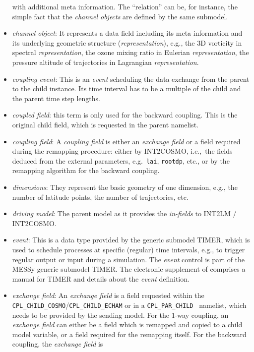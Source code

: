 \documentclass[11pt,twoside]{article}
\begin{document}
\begin{appendix}
\begin{itemize}
with additional meta information. The ``relation'' can be, for instance, the 
simple fact that the {\it channel objects} are defined by the same submodel.
\item {\it channel object}: It represents a data field including
its meta information and its underlying
geometric structure ({\it representation}), e.g., the 3D vorticity in
 spectral {\it representation}, the ozone mixing ratio in Eulerian 
{\it representation}, the pressure altitude of trajectories in Lagrangian 
{\it representation}.
\item {\it coupling event}: This is an {\it event} scheduling the data exchange
  from the parent to the child instance. Its time interval has to be a
  multiple of the child and the parent time step lengths.
\item {\it coupled field}: this term is only used for the backward
coupling. This is the original child field, which is requested in the
parent namelist.
\item {\it coupling field}: A {\it coupling field} is either an
 {\it exchange field} or a field required during the remapping procedure: 
 either by INT2COSMO, i.e.,\ the fields
 deduced from the external parameters, e.g.\ \verb|lai|, \verb|rootdp|,
 etc., or by the remapping algorithm for the backward coupling.
\item {\it dimensions}: They represent the basic geometry of one dimension,
e.g., the number of latitude points, the number of trajectories, etc.
\item {\it driving model}: The parent model as it provides the 
  {\it in-fields} to INT2LM / INT2COSMO.
\item {\it event}: This is a data type provided by the generic submodel TIMER,
  which is used to schedule processes at specific (regular) time intervals, 
e.g., to trigger regular output or input during a simulation. The {\it event} 
control is part of the MESSy generic submodel TIMER. The electronic supplement 
of \cite{Joeckel10a} comprises a manual for TIMER and details about the 
{\it event} definition.
\item {\it exchange field}: An {\it exchange field} is a field requested within 
  the \verb|CPL_CHILD_COSMO|/\verb|CPL_CHILD_ECHAM| or in
  a \verb|CPL_PAR_CHILD | namelist, which needs to be provided by the sending
  model. For the 1-way coupling, 
  an {\it exchange field} can either be a field which is remapped and copied
  to a child model variable, or a field required for the 
  remapping itself. For the backward coupling, the {\it exchange field} is

\end{itemize}
\end{appendix}
\end{document}
